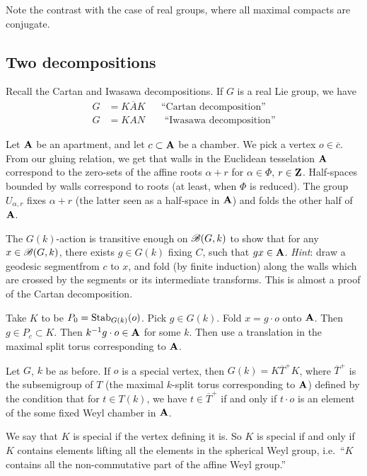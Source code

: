 Note the contrast with the case of real groups, where all maximal compacts 
are conjugate. 


\subsection{Two decompositions}

Recall the Cartan and Iwasawa decompositions. If $G$ is a real Lie group, we 
have 
\begin{align*}
  G &= K \overline A K && \text{``Cartan decomposition''} \\
  G &= K A N && \text{	``Iwasawa decomposition''}
\end{align*}

Let $\mathbf{A}$ be an apartment, and let $c\subset \mathbf{A}$ be a chamber. We pick a 
vertex $o\in \overline c$. From our gluing relation, we get that walls in 
the Euclidean tesselation $\mathbf{A}$ correspond to the zero-sets of the affine 
roots $\alpha+r$ for $\alpha\in \Phi$, $r\in \mathbf{Z}$. Half-spaces bounded by 
walls correspond to roots (at least, when $\Phi$ is reduced). The group 
$U_{\alpha,r}$ fixes $\alpha+r$ (the latter seen as a half-space in $\mathbf{A}$) 
and folds the other half of $\mathbf{A}$. 

The $G(k)$-action is transitive enough on $\mathscr{B}(G,k)$ to show that for any 
$x\in \mathscr{B}(G,k)$, there exists $g\in G(k)$ fixing $C$, such that 
$g x\in \mathbf{A}$. \emph{Hint}: draw a geodesic segmentfrom $c$ to $x$, and fold (by 
finite induction) along the walls which are 
crossed by the segments or its intermediate transforms. This is almost a proof 
of the Cartan decomposition. 

Take $K$ to be $P_0=\operatorname{Stab}_{G(k)}(o)$. Pick $g\in G(k)$. Fold $x=g\cdot o$ onto 
$\mathbf{A}$. Then $g\in P_c\subset K$. Then $k^{-1} g\cdot o\in \mathbf{A}$ for some $k$. 
Then use a translation in the maximal split torus corresponding to $\mathbf{A}$. 

\begin{theo}
Let $G$, $k$ be as before. If $o$ is a special vertex, then 
$G(k)=K \overline T^+ K$, where $\overline T^+$ is the subsemigroup of $T$ 
(the maximal $k$-split torus corresponding to $\mathbf{A}$) defined by the condition 
that for $t\in T(k)$, we have $t\in \overline T^+$ if and only if 
$t\cdot o$ is an element of the some fixed Weyl chamber in $\mathbf{A}$. 
\end{theo}

We say that $K$ is special if the vertex defining it is. So $K$ is special if 
and only if $K$ contains elements lifting all the elements in the spherical 
Weyl group, i.e.\ ``$K$ contains all the non-commutative part of the affine 
Weyl group.'' 

